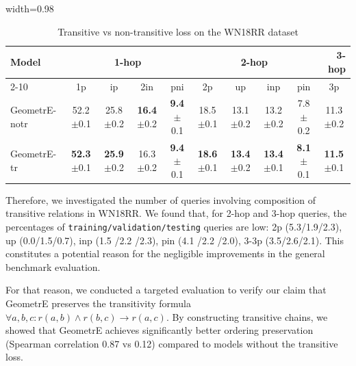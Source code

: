 \documentclass[runningheads]{llncs}
\newcommand{\f}[1]{\textbf{#1}}
\newcommand{\method}{GeometrE}
\begin{document}
\begin{table}[tbp]
  \centering
  \caption{Transitive vs non-transitive loss on the WN18RR dataset}
  \begin{adjustbox}{width=0.98\textwidth}
    \begin{tabular}{lccccccccc}
      \toprule
      \multirow{2}{*}{Model} & \multicolumn{4}{c|}{1-hop} & \multicolumn{4}{c|}{2-hop} & \multicolumn{1}{r}{3-hop}\\
      \cmidrule{2-10}
                             &1p                               & ip                               &2in                              & pni                       &2p                         &up                         & inp                        &pin                       &3p           \\
\method{}-notr & 52.2{\scriptsize $\pm$0.1 } & 25.8{\scriptsize $\pm$0.2 } & \f{16.4}{\scriptsize $\pm$0.2 } & \f{9.4}{\scriptsize $\pm$0.1 } & 18.5{\scriptsize $\pm$0.1 } & 13.1{\scriptsize $\pm$0.2 } & 13.2{\scriptsize $\pm$0.2 } & 7.8{\scriptsize $\pm$0.2 } & 11.3{\scriptsize $\pm$0.2 }  \\
      \method{}-tr & \f{52.3}{\scriptsize $\pm$0.1 } & \f{25.9}{\scriptsize $\pm$0.2 } & 16.3{\scriptsize $\pm$0.2 } & \f{9.4}{\scriptsize $\pm$0.1 } & \f{18.6}{\scriptsize $\pm$0.1 } & \f{13.4}{\scriptsize $\pm$0.2 } & \f{13.4}{\scriptsize $\pm$0.1 } & \f{8.1}{\scriptsize $\pm$0.1 } & \f{11.5}{\scriptsize $\pm$0.1 }  \\
      \bottomrule
  \end{tabular}
  \end{adjustbox}
  \label{tab:transitive}
\end{table}


Therefore, we investigated the number of queries involving composition
of transitive relations in WN18RR. We found that, for 2-hop and 3-hop
queries, the percentages of \texttt{training/validation/testing}
queries are low: 2p (5.3/1.9/2.3), up (0.0/1.5/0.7), inp (1.5 /2.2
/2.3), pin (4.1 /2.2 /2.0), 3-3p (3.5/2.6/2.1). This constitutes a
potential reason for the negligible improvements in the general
benchmark evaluation.

For that reason, we conducted a targeted evaluation to verify our
claim that GeometrE preserves the transitivity formula $\forall a,b,c:
r(a,b) \land r(b,c) \to r(a,c)$. By constructing transitive chains, we
showed that GeometrE achieves significantly better ordering
preservation (Spearman correlation 0.87 vs 0.12) compared to models
without the transitive loss.  
\end{document}
